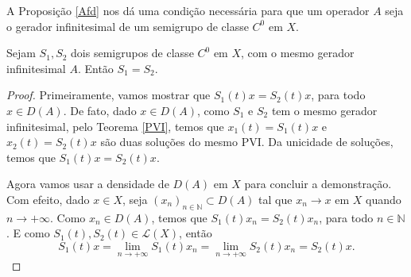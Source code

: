 \begin{remark}
    A Proposição \ref{Afd} nos dá uma condição necessária para que um operador $A$ seja o gerador infinitesimal de um semigrupo de classe $C^0$ em $X$.
\end{remark}

\begin{proposition}[Unicidade]
Sejam $S_1,S_2$ dois semigrupos de classe $C^0$ em $X$, com o mesmo gerador infinitesimal $A$. Então $S_1=S_2$.
\end{proposition}
\begin{proof}
   Primeiramente, vamos mostrar que $S_1(t)x=S_2(t)x$, para todo $x\in D(A)$.
De fato, dado $x\in D(A)$, como $S_1$ e $S_2$ tem o mesmo gerador infinitesimal,  pelo Teorema \ref{PVI}, temos que $x_1(t)=S_1(t)x$ e $x_2(t)=S_2(t)x$ são duas soluções do mesmo PVI. Da unicidade de soluções, temos que $S_1(t)x=S_2(t)x$.

Agora vamos usar a densidade de $D(A)$ em $X$ para concluir a demonstração. Com efeito, dado $x\in X$, seja $(x_n)_{n\in \mathbb{N}}\subset D(A)$ tal que $x_n\to x$ em $X$ quando $n\to +\infty$. Como   $x_n\in D(A)$, temos que $S_1(t)x_n=S_2(t)x_n$, para todo $n\in \mathbb{N}$. E como  $S_1(t),S_2(t)\in \mathcal{L}(X)$, então
\[S_1(t)x=\lim_{n\to +\infty}S_1(t)x_n=\lim_{n\to +\infty}S_2(t)x_n=S_2 (t)x.\]
\end{proof}






